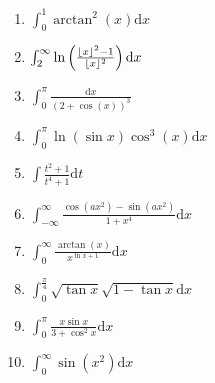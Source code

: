 \documentclass[11pt, a4paper]{article}
\DeclarePairedDelimiter{\floor}{\lfloor}{\rfloor}
\newcommand{\dd}{\mathrm{d}}
\begin{document}
\begin{enumerate}


    \item $\int_0^1 \arctan^2(x) \dd x$
\item $\int_2^{\infty} \ln\left(\frac{\floor{x}^2-1}{\floor{x}^2}\right) \dd x$
\item  $\int_0^{\pi} \frac{\dd x}{(2+\cos(x))^3} $
\item $\int_0^{\pi} \ln(\sin{x})\cos^3(x) \dd x$
\item $\int \frac{t^2+1}{t^4+1} \dd t$
\item $\int_{-\infty}^{\infty} \frac{\cos(ax^2)-\sin(ax^2)}{1+x^4} \dd x$
\item $\int_0^{\infty} \frac{\arctan(x)}{x^{\ln{x}+1}} \dd x$
\item $\int_0^{\frac{\pi}{4}} \sqrt{\tan{x}}\sqrt{1-\tan{x}} \dd x$
\item $\int_0^{\pi} \frac{x\sin{x}}{3+\cos^{2}{x}} \dd x$
\item $\int_0^{\infty} \sin(x^2) \dd x$
    
    \end{enumerate}
\end{document}
